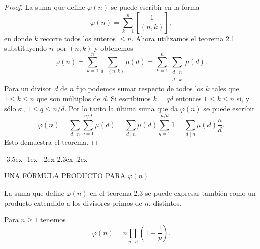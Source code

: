 \documentclass[12pt,a4paper]{book}
\makeatletter
\renewcommand\section{\@startsection{section}{1}{\z@}%
  {-3.5ex \@plus -1ex \@minus -.2ex}%
  {2.3ex \@plus .2ex}%
  {\normalfont\Large\bfseries\raggedright}}
\makeatother
\begin{document}
    \begin{proof}
        La suma que define $\varphi(n)$ se puede escribir en la forma
        \begin{equation*}
            \varphi(n)=\sum_{k=1}^{n}\left[\frac{1}{(n,k)}\right],
        \end{equation*}
        en donde $k$ recorre todos los enteros $\leq n$. Ahora utilizamos el teorema 2.1
        substituyendo $n$ por $(n,k)$ y obtenemos
        \begin{equation*}
            \varphi(n)=\sum_{k=1}^{n}\sum_{d\mid(n,k)}\mu(d)
            =\sum_{k=1}^{n}\sum_{\substack{d\mid n\\ d\mid k}}\mu(d).
        \end{equation*}
        Para un divisor $d$ de $n$ fijo podemos sumar respecto de todos los $k$ tales que
        $1\leq k\leq n$ que son múltiplos de $d$. Si escribimos $k=qd$ entonces
        $1\leq k\leq n$ si, y sólo si, $1\leq q\leq n/d$. Por lo tanto la última suma que da
        $\varphi(n)$ se puede escribir
        \begin{equation*}
            \varphi(n)=\sum_{d\mid n}\sum_{q=1}^{n/d}\mu(d)
            =\sum_{d\mid n}\mu(d)\sum_{q=1}^{n/d}1=\sum_{d\mid n}\mu(d)\frac{n}{d}.
        \end{equation*}
        Esto demuestra el teorema.
    \end{proof}

    \section{UNA FÓRMULA PRODUCTO PARA \texorpdfstring{$\varphi(n)$}{φ(n)}}

    La suma que define $\varphi(n)$ en el teorema 2.3 se puede expresar también como un
    producto extendido a los divisores primos de $n$, distintos.

    \begin{teorema}
        Para $n\geq1$ tenemos
        \begin{equation}
            \varphi(n)=n\prod_{p\mid n}\left(1-\frac{1}{p}\right).
        \end{equation}
    \end{teorema}
\end{document}
